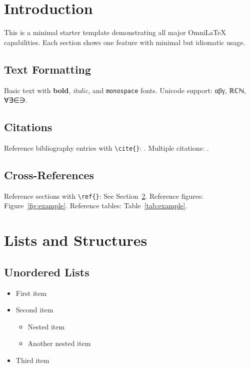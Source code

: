 \documentclass[
    language=english,
    institution=none,        %
    oneside,                 %
]{../../omnilatex}
\begin{document}
\maketitle

\tableofcontents

\chapter{Introduction}

This is a minimal starter template demonstrating all major OmniLaTeX capabilities.
Each section shows one feature with minimal but idiomatic usage.

\section{Text Formatting}

Basic text with \textbf{bold}, \textit{italic}, and \texttt{monospace} fonts.
Unicode support: αβγ, ℝℂℕ, ∀∃∈∋.

\section{Citations}

Reference bibliography entries with \verb|\cite{}|: \cite{knuth1984texbook}.
Multiple citations: \cite{lamport1994latex,goossens1994latex}.

\section{Cross-References}

Reference sections with \verb|\ref{}|: See Section~\ref{sec:lists}.
Reference figures: Figure~\ref{fig:example}.
Reference tables: Table~\ref{tab:example}.

\chapter{Lists and Structures}
\label{sec:lists}

\section{Unordered Lists}

\begin{itemize}
    \item First item
    \item Second item
          \begin{itemize}
              \item Nested item
              \item Another nested item
          \end{itemize}
    \item Third item
\end{itemize}
\end{document}
